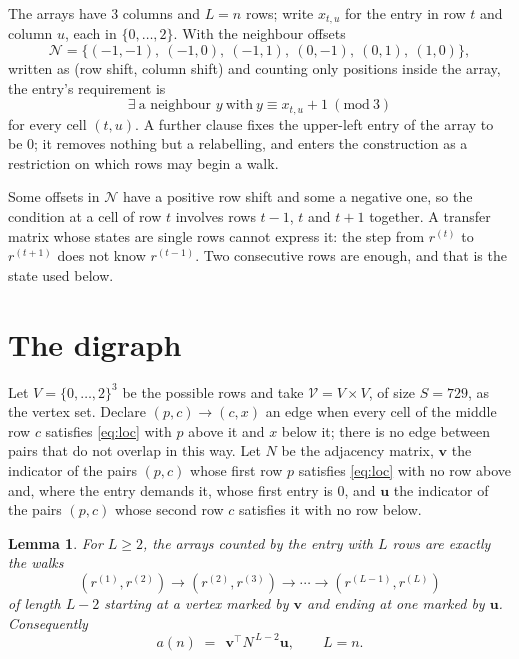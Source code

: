 \documentclass[11pt,a4paper]{article}
\theoremstyle{plain}
\newtheorem{lemma}[theorem]{Lemma}
\theoremstyle{definition}
\begin{document}
The arrays have $3$ columns and $L=n$ rows; write $x_{t,u}$ for the entry in
row $t$ and column $u$, each in $\{0,\dots,2\}$. With the neighbour offsets
\[
\mathcal N=\{(-1,-1),\ (-1,0),\ (-1,1),\ (0,-1),\ (0,1),\ (1,0)\},
\]
written as (row shift, column shift) and counting only positions inside the array, the
entry's requirement is
\begin{equation}\label{eq:loc}
\exists\ \text{a neighbour }y\ \text{with}\ y\equiv x_{t,u}+1\ (\mathrm{mod}\ 3)
\end{equation}
for every cell $(t,u)$. A further clause fixes the upper-left entry of the array to be $0$; it removes nothing but a relabelling, and enters the construction as a restriction on which rows may begin a walk.

Some offsets in $\mathcal N$ have a positive row shift and some a negative one, so the
condition at a cell of row $t$ involves rows $t-1$, $t$ and $t+1$ together. A transfer
matrix whose states are single rows cannot express it: the step from $r^{(t)}$ to
$r^{(t+1)}$ does not know $r^{(t-1)}$. Two consecutive rows are enough, and that is
the state used below.

\section{The digraph}

Let $V=\{0,\dots,2\}^{3}$ be the possible rows and take
$\mathcal V=V\times V$, of size $S=729$, as the vertex set. Declare $(p,c)\to(c,x)$ an edge
when every cell of the middle row $c$ satisfies \eqref{eq:loc} with $p$ above it and $x$
below it; there is no edge between pairs that do not overlap in this way. Let $N$ be the
adjacency matrix, $\mathbf{v}$ the indicator of the pairs $(p,c)$ whose first row $p$
satisfies \eqref{eq:loc} with no row above and, where the entry demands it, whose first entry is $0$, and $\mathbf{u}$ the indicator of
the pairs $(p,c)$ whose second row $c$ satisfies it with no row below.

\begin{lemma}\label{lem:walk}
For $L\ge2$, the arrays counted by the entry with $L$ rows are exactly the walks
\[
(r^{(1)},r^{(2)})\to(r^{(2)},r^{(3)})\to\cdots\to(r^{(L-1)},r^{(L)})
\]
of length $L-2$ starting at a vertex marked by $\mathbf{v}$ and ending at one marked by
$\mathbf{u}$. Consequently
\[
a(n)\;=\;\,\mathbf{v}^{\!\top}N^{\,L-2}\mathbf{u},\qquad L=n .
\]
\end{lemma}
\end{document}
